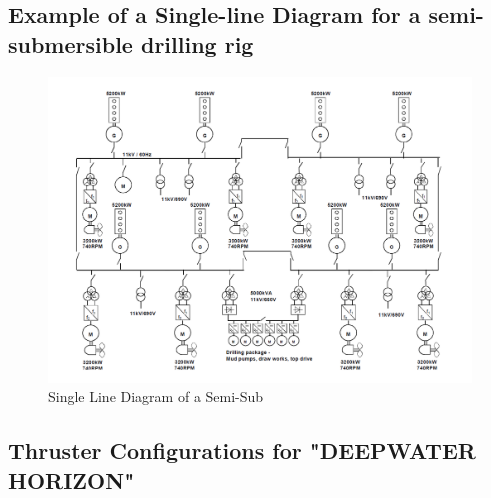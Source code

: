 \subsection{Example of a Single-line Diagram for a semi-submersible drilling rig}\label{Sec:Single-line_diagrams}
\begin{figure}[H]
    \centering
    \includegraphics[width = \textwidth ]{figures/Comp_SingleLineDiagram.png}
    \caption{Single Line Diagram of a Semi-Sub \cite{MarReg1Comp}}
    \label{fig:Comp_SingleLineDiagram}
\end{figure}



\newpage
\subsection{Thruster Configurations for "DEEPWATER HORIZON"} \label{Sec:ThrusterConfiguratons}

